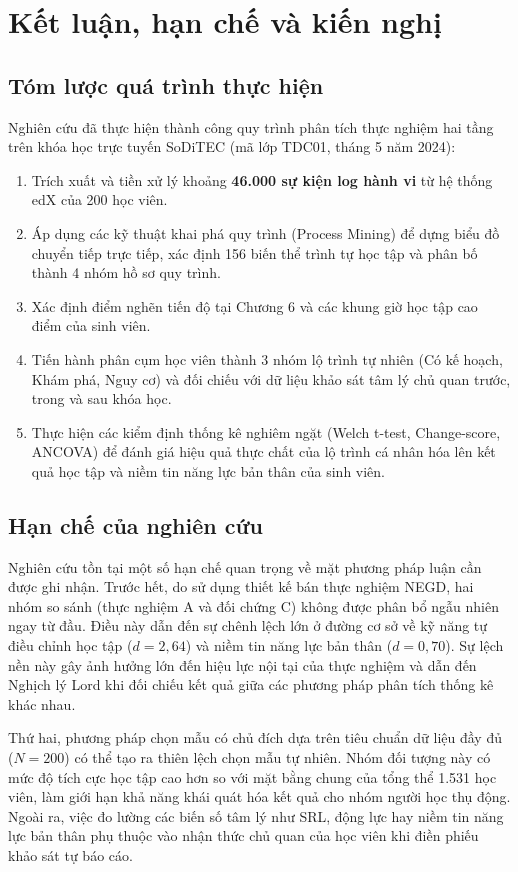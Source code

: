 \section{Kết luận, hạn chế và kiến nghị}

\subsection{Tóm lược quá trình thực hiện}

Nghiên cứu đã thực hiện thành công quy trình phân tích thực nghiệm hai tầng trên khóa học trực tuyến SoDiTEC (mã lớp TDC01, tháng 5 năm 2024):
\begin{enumerate}
    \item Trích xuất và tiền xử lý khoảng \textbf{46.000 sự kiện log hành vi} từ hệ thống edX của 200 học viên.
    \item Áp dụng các kỹ thuật khai phá quy trình (Process Mining) để dựng biểu đồ chuyển tiếp trực tiếp, xác định 156 biến thể trình tự học tập và phân bố thành 4 nhóm hồ sơ quy trình.
    \item Xác định điểm nghẽn tiến độ tại Chương 6 và các khung giờ học tập cao điểm của sinh viên.
    \item Tiến hành phân cụm học viên thành 3 nhóm lộ trình tự nhiên (Có kế hoạch, Khám phá, Nguy cơ) và đối chiếu với dữ liệu khảo sát tâm lý chủ quan trước, trong và sau khóa học.
    \item Thực hiện các kiểm định thống kê nghiêm ngặt (Welch t-test, Change-score, ANCOVA) để đánh giá hiệu quả thực chất của lộ trình cá nhân hóa lên kết quả học tập và niềm tin năng lực bản thân của sinh viên.
\end{enumerate}

\subsection{Hạn chế của nghiên cứu}

Nghiên cứu tồn tại một số hạn chế quan trọng về mặt phương pháp luận cần được ghi nhận. Trước hết, do sử dụng thiết kế bán thực nghiệm NEGD, hai nhóm so sánh (thực nghiệm A và đối chứng C) không được phân bổ ngẫu nhiên ngay từ đầu. Điều này dẫn đến sự chênh lệch lớn ở đường cơ sở về kỹ năng tự điều chỉnh học tập ($d = 2,64$) và niềm tin năng lực bản thân ($d = 0,70$). Sự lệch nền này gây ảnh hưởng lớn đến hiệu lực nội tại của thực nghiệm và dẫn đến Nghịch lý Lord khi đối chiếu kết quả giữa các phương pháp phân tích thống kê khác nhau.

Thứ hai, phương pháp chọn mẫu có chủ đích dựa trên tiêu chuẩn dữ liệu đầy đủ ($N = 200$) có thể tạo ra thiên lệch chọn mẫu tự nhiên. Nhóm đối tượng này có mức độ tích cực học tập cao hơn so với mặt bằng chung của tổng thể 1.531 học viên, làm giới hạn khả năng khái quát hóa kết quả cho nhóm người học thụ động. Ngoài ra, việc đo lường các biến số tâm lý như SRL, động lực hay niềm tin năng lực bản thân phụ thuộc vào nhận thức chủ quan của học viên khi điền phiếu khảo sát tự báo cáo.

